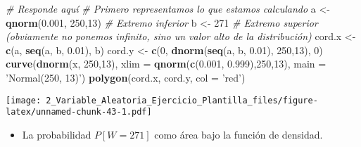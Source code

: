 \documentclass[
]{article}
\newenvironment{Shaded}{\begin{snugshade}}{\end{snugshade}}
\newcommand{\CommentTok}[1]{\textcolor[rgb]{0.56,0.35,0.01}{\textit{#1}}}
\newcommand{\DataTypeTok}[1]{\textcolor[rgb]{0.13,0.29,0.53}{#1}}
\newcommand{\DecValTok}[1]{\textcolor[rgb]{0.00,0.00,0.81}{#1}}
\newcommand{\FloatTok}[1]{\textcolor[rgb]{0.00,0.00,0.81}{#1}}
\newcommand{\KeywordTok}[1]{\textcolor[rgb]{0.13,0.29,0.53}{\textbf{#1}}}
\newcommand{\NormalTok}[1]{#1}
\newcommand{\StringTok}[1]{\textcolor[rgb]{0.31,0.60,0.02}{#1}}
\providecommand{\tightlist}{%
  \setlength{\itemsep}{0pt}\setlength{\parskip}{0pt}}
\begin{document}
\begin{Shaded}
\begin{Highlighting}[]
\CommentTok{# Responde aquí}
\CommentTok{# Primero representamos lo que estamos calculando}
\NormalTok{a <-}\StringTok{ }\KeywordTok{qnorm}\NormalTok{(}\FloatTok{0.001}\NormalTok{, }\DecValTok{250}\NormalTok{,}\DecValTok{13}\NormalTok{) }\CommentTok{# Extremo inferior}
\NormalTok{b <-}\StringTok{ }\DecValTok{271} \CommentTok{# Extremo superior (obviamente no ponemos infinito, sino un valor alto de la distribución)}
\NormalTok{cord.x <-}\StringTok{ }\KeywordTok{c}\NormalTok{(a, }\KeywordTok{seq}\NormalTok{(a, b, }\FloatTok{0.01}\NormalTok{), b) }
\NormalTok{cord.y <-}\StringTok{ }\KeywordTok{c}\NormalTok{(}\DecValTok{0}\NormalTok{, }\KeywordTok{dnorm}\NormalTok{(}\KeywordTok{seq}\NormalTok{(a, b, }\FloatTok{0.01}\NormalTok{), }\DecValTok{250}\NormalTok{,}\DecValTok{13}\NormalTok{), }\DecValTok{0}\NormalTok{) }
\KeywordTok{curve}\NormalTok{(}\KeywordTok{dnorm}\NormalTok{(x, }\DecValTok{250}\NormalTok{,}\DecValTok{13}\NormalTok{), }\DataTypeTok{xlim =} \KeywordTok{qnorm}\NormalTok{(}\KeywordTok{c}\NormalTok{(}\FloatTok{0.001}\NormalTok{, }\FloatTok{0.999}\NormalTok{),}\DecValTok{250}\NormalTok{,}\DecValTok{13}\NormalTok{), }\DataTypeTok{main =} \StringTok{'Normal(250, 13)'}\NormalTok{) }
\KeywordTok{polygon}\NormalTok{(cord.x, cord.y, }\DataTypeTok{col =} \StringTok{'red'}\NormalTok{)}
\end{Highlighting}
\end{Shaded}

\texttt{[image: 2\_Variable\_Aleatoria\_Ejercicio\_Plantilla\_files/figure-latex/unnamed-chunk-43-1.pdf]}

\begin{itemize}
\tightlist
\item
  La probabilidad \(P [W = 271]\) como área bajo la función de densidad.
\end{itemize}
\end{document}
